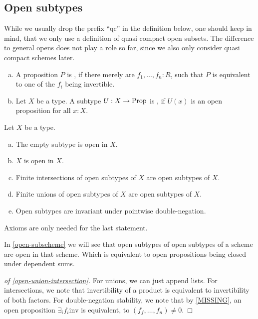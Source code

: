 \subsection{Open subtypes}

While we usually drop the prefix ``qc'' in the definition below,
one should keep in mind, that we only use a definition of quasi compact open subsets.
The difference to general opens does not play a role so far,
since we also only consider quasi compact schemes later.

\begin{definition}%
  \label{qc-open}
  \begin{enumerate}[(a)]
  \item A proposition $P$ is , if there merely are $f_1,\dots,f_n:R$,
    such that $P$ is equivalent to one of the $f_i$ being invertible.
  \item Let $X$ be a type.
    A subtype $U:X\to\mathrm{Prop}$ is , if $U(x)$ is an open proposition for all $x:X$.
  \end{enumerate}
\end{definition}

\begin{proposition}%
  \label{open-union-intersection}
  Let $X$ be a type.
  \begin{enumerate}[(a)]
  \item The empty subtype is open in $X$.
  \item $X$ is open in $X$.
  \item Finite intersections of open subtypes of $X$ are open subtypes of $X$.
  \item Finite unions of open subtypes of $X$ are open subtypes of $X$.
  \item Open subtypes are invariant under pointwise double-negation.
  \end{enumerate}
  Axioms are only needed for the last statement.
\end{proposition}

In \cref{open-subscheme} we will see that open subtypes of open subtypes of a scheme are open in that scheme.
Which is equivalent to open propositions being closed under dependent sums.

\begin{proof}[of \cref{open-union-intersection}]
  For unions, we can just append lists.
  For intersections, we note that invertibility of a product
  is equivalent to invertibility of both factors.
  For double-negation stability,
  we note that by \cref{MISSING},
  an open proposition $\exists_i f_i \mathrm{inv}$ is equivalent,
  to $(f_f,\dots,f_n)\neq 0$.
\end{proof}

